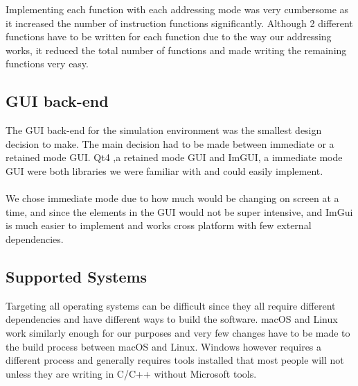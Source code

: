 \documentclass[conference]{IEEEtran}
\begin{document}
Implementing each function with each addressing mode was very cumbersome as it increased the number of instruction functions significantly. Although 2 different functions have to be written for each function due to the way our addressing works, it reduced the total number of functions and made writing the remaining functions very easy. 

\subsection{GUI back-end}

The GUI back-end for the simulation environment was the smallest design decision to make. The main decision had to be made between immediate or a retained mode GUI. Qt4 ,a retained mode GUI and ImGUI, a immediate mode GUI were both libraries we were familiar with and could easily implement. \\

\\

We chose immediate mode due to how much would be changing on screen at a time, and since the elements in the GUI would not be super intensive, and ImGui is much easier to implement and works cross platform with few external dependencies.




\subsection{Supported Systems}

Targeting all operating systems can be difficult since they all require different dependencies and have different ways to build the software. macOS and Linux work similarly enough for our purposes and very few changes have to be made to the build process between macOS and Linux. Windows however requires a different process and generally requires tools installed that most people will not unless they are writing in C/C++ without Microsoft tools. \\
\end{document}
